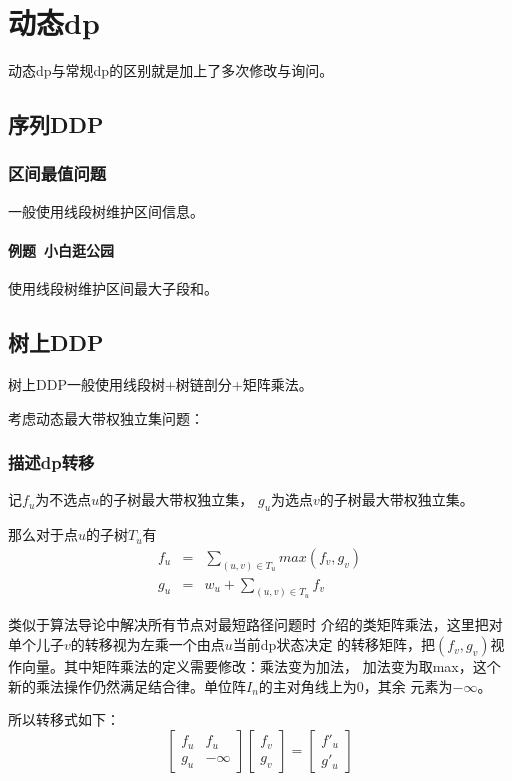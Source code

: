 \section{动态dp}
动态dp与常规dp的区别就是加上了多次修改与询问。
\subsection{序列DDP}
\subsubsection{区间最值问题}
一般使用线段树维护区间信息。
\paragraph{例题~小白逛公园}
使用线段树维护区间最大子段和。

\subsection{树上DDP}
树上DDP一般使用线段树+树链剖分+矩阵乘法。

考虑动态最大带权独立集问题：
\subsubsection{描述dp转移}
记$f_u$为不选点$u$的子树最大带权独立集，
$g_u$为选点$v$的子树最大带权独立集。

那么对于点$u$的子树$T_u$有
\begin{eqnarray*}
    f_u&=&\sum_{(u,v)\in T_u}{max(f_v,g_v)}\\
    g_u&=&w_u+\sum_{(u,v)\in T_u}{f_v}
\end{eqnarray*}

类似于算法导论\cite{ITA3}中解决所有节点对最短路径问题时
介绍的类矩阵乘法，这里把对单个儿子$v$的转移视为左乘一个由点$u$当前dp状态决定
的转移矩阵，把$(f_v,g_v)$视作向量。其中矩阵乘法的定义需要修改：乘法变为加法，
加法变为取max，这个新的乘法操作仍然满足结合律。单位阵$I_n$的主对角线上为0，其余
元素为$-\infty$。

所以转移式如下：
\begin{displaymath}
    \left[
    \begin{array}{cc}
        f_u&f_u\\
        g_u&-\infty
    \end{array}\right]
    \left[
    \begin{array}{c}
        f_v\\g_v
    \end{array}\right]  =
    \left[
    \begin{array}{c}
        f'_u\\g'_u
    \end{array}\right]
\end{displaymath}

